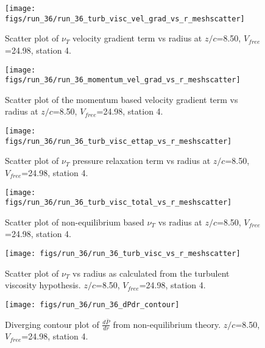 \begin{figure}[H]
\centering
\texttt{[image: figs/run\_36/run\_36\_turb\_visc\_vel\_grad\_vs\_r\_meshscatter]}
\caption{Scatter plot of $\nu_T$ velocity gradient term vs radius at $z/c$=8.50, $V_{free}$=24.98, station 4.}
\end{figure}


\begin{figure}[H]
\centering
\texttt{[image: figs/run\_36/run\_36\_momentum\_vel\_grad\_vs\_r\_meshscatter]}
\caption{Scatter plot of the momentum based velocity gradient term vs radius at $z/c$=8.50, $V_{free}$=24.98, station 4.}
\end{figure}


\begin{figure}[H]
\centering
\texttt{[image: figs/run\_36/run\_36\_turb\_visc\_ettap\_vs\_r\_meshscatter]}
\caption{Scatter plot of $\nu_T$ pressure relaxation term vs radius at $z/c$=8.50, $V_{free}$=24.98, station 4.}
\end{figure}


\begin{figure}[H]
\centering
\texttt{[image: figs/run\_36/run\_36\_turb\_visc\_total\_vs\_r\_meshscatter]}
\caption{Scatter plot of non-equilibrium based $\nu_T$ vs radius at $z/c$=8.50, $V_{free}$=24.98, station 4.}
\end{figure}


\begin{figure}[H]
\centering
\texttt{[image: figs/run\_36/run\_36\_turb\_visc\_vs\_r\_meshscatter]}
\caption{Scatter plot of $\nu_T$ vs radius as calculated from the turbulent viscosity hypothesis. $z/c$=8.50, $V_{free}$=24.98, station 4.}
\end{figure}


\begin{figure}[H]
\centering
\texttt{[image: figs/run\_36/run\_36\_dPdr\_contour]}
\caption{Diverging contour plot of $\frac{d\bar{P}}{dr}$ from non-equilibrium theory. $z/c$=8.50, $V_{free}$=24.98, station 4.}
\end{figure}


